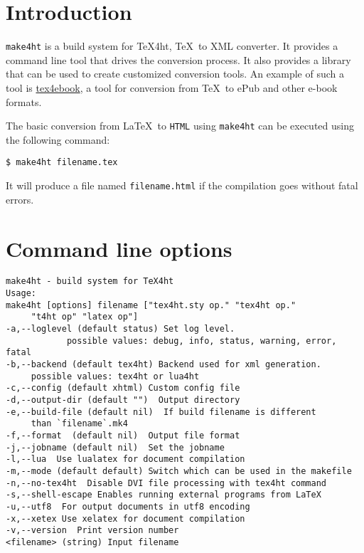 \hypertarget{introduction}{%
\section{Introduction}\label{introduction}}

\texttt{make4ht} is a build system for \TeX4ht, \TeX~to XML converter.
It provides a command line tool that drives the conversion process. It
also provides a library that can be used to create customized conversion
tools. An example of such a tool is
\href{https://github.com/michal-h21/tex4ebook}{tex4ebook}, a tool for
conversion from \TeX~to ePub and other e-book formats.

The basic conversion from \LaTeX~to \texttt{HTML} using \texttt{make4ht}
can be executed using the following command:

\begin{verbatim}
$ make4ht filename.tex
\end{verbatim}

It will produce a file named \texttt{filename.html} if the compilation
goes without fatal errors.

\hypertarget{clioptions}{%
\section{Command line options}\label{clioptions}}

\label{sec:clioptions}

\begin{verbatim}
make4ht - build system for TeX4ht
Usage:
make4ht [options] filename ["tex4ht.sty op." "tex4ht op." 
     "t4ht op" "latex op"]
-a,--loglevel (default status) Set log level.
            possible values: debug, info, status, warning, error, fatal
-b,--backend (default tex4ht) Backend used for xml generation.
     possible values: tex4ht or lua4ht
-c,--config (default xhtml) Custom config file
-d,--output-dir (default "")  Output directory
-e,--build-file (default nil)  If build filename is different 
     than `filename`.mk4
-f,--format  (default nil)  Output file format
-j,--jobname (default nil)  Set the jobname
-l,--lua  Use lualatex for document compilation
-m,--mode (default default) Switch which can be used in the makefile
-n,--no-tex4ht  Disable DVI file processing with tex4ht command
-s,--shell-escape Enables running external programs from LaTeX
-u,--utf8  For output documents in utf8 encoding
-x,--xetex Use xelatex for document compilation
-v,--version  Print version number
<filename> (string) Input filename
\end{verbatim}

